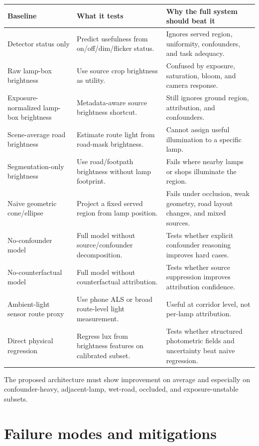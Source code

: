 \documentclass[11pt]{article}
\begin{document}
\begin{center}
\scriptsize
\begin{tabular}{p{}p{}p{}}
\toprule
\textbf{Baseline} & \textbf{What it tests} & \textbf{Why the full system should beat it} \\
\midrule
Detector status only & Predict usefulness from on/off/dim/flicker status. & Ignores served region, uniformity, confounders, and task adequacy. \\
Raw lamp-box brightness & Use source crop brightness as utility. & Confused by exposure, saturation, bloom, and camera response. \\
Exposure-normalized lamp-box brightness & Metadata-aware source brightness shortcut. & Still ignores ground region, attribution, and confounders. \\
Scene-average road brightness & Estimate route light from road-mask brightness. & Cannot assign useful illumination to a specific lamp. \\
Segmentation-only brightness & Use road/footpath brightness without lamp footprint. & Fails where nearby lamps or shops illuminate the region. \\
Naive geometric cone/ellipse & Project a fixed served region from lamp position. & Fails under occlusion, weak geometry, road layout changes, and mixed sources. \\
No-confounder model & Full model without source/confounder decomposition. & Tests whether explicit confounder reasoning improves hard cases. \\
No-counterfactual model & Full model without counterfactual attribution. & Tests whether source suppression improves attribution confidence. \\
Ambient-light sensor route proxy & Use phone ALS or broad route-level light measurement. & Useful at corridor level, not per-lamp attribution. \\
Direct physical regression & Regress lux from brightness features on calibrated subset. & Tests whether structured photometric fields and uncertainty beat naive regression. \\
\bottomrule
\end{tabular}
\end{center}

The proposed architecture must show improvement on average and especially on confounder-heavy, adjacent-lamp, wet-road, occluded, and exposure-unstable subsets.

\section{Failure modes and mitigations}
\end{document}
